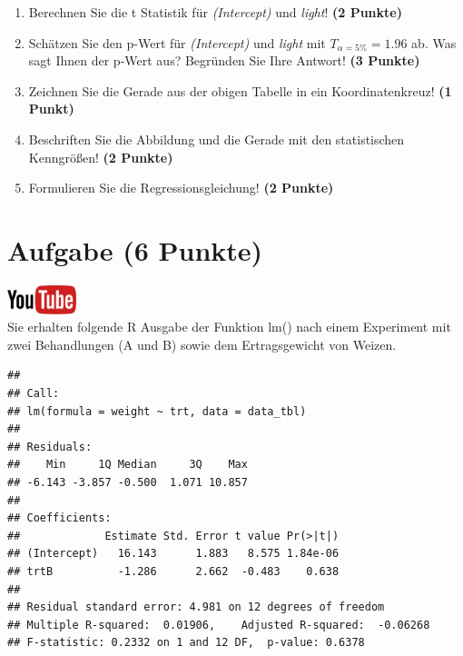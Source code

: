 \documentclass[a4paper, 10pt]{scrartcl}\usepackage[]{graphicx}\usepackage[]{xcolor}
\makeatletter
\newenvironment{kframe}{%
 \def\at@end@of@kframe{}%
 \ifinner\ifhmode%
  \def\at@end@of@kframe{\end{minipage}}%
  \begin{minipage}{\columnwidth}%
 \fi\fi%
 \def\FrameCommand##1{\hskip\@totalleftmargin \hskip-\fboxsep
 \colorbox{shadecolor}{##1}\hskip-\fboxsep
     \hskip-\linewidth \hskip-\@totalleftmargin \hskip\columnwidth}%
 \MakeFramed {\advance\hsize-\width
   \@totalleftmargin\z@ \linewidth\hsize
   \@setminipage}}%
 {\par\unskip\endMakeFramed%
 \at@end@of@kframe}
\newenvironment{knitrout}{}{} %
\makeatother
\begin{document}
\begin{enumerate}
\item Berechnen Sie die t Statistik f{\"u}r \textit{(Intercept)} und
  \textit{light}! \textbf{(2 Punkte)}
\item Sch{\"a}tzen Sie den p-Wert f{\"u}r \textit{(Intercept)} und
  \textit{light} mit $T_{\alpha = 5\%} = 1.96$ ab. Was sagt Ihnen der p-Wert aus?
  Begr{\"u}nden Sie Ihre Antwort! \textbf{(3 Punkte)}
\item Zeichnen Sie die Gerade aus der obigen Tabelle in ein Koordinatenkreuz! \textbf{(1 Punkt)}
\item Beschriften Sie die Abbildung und die Gerade mit den statistischen
  Kenngr{\"o}{\ss}en! \textbf{(2 Punkte)}
\item Formulieren Sie die Regressionsgleichung! \textbf{(2 Punkte)}
\end{enumerate} 
\clearpage

\section{Aufgabe \hfill (6 Punkte)}

\hfill\href{https://youtu.be/tNNzcndrpSk}{\includegraphics[width =
  2cm]{img/youtube}}\\[1Ex]

Sie erhalten folgende R Ausgabe der Funktion lm() nach einem Experiment mit
zwei Behandlungen (A und B) sowie dem Ertragsgewicht von Weizen.

\begin{knitrout}
\color{fgcolor}\begin{kframe}
\begin{verbatim}
## 
## Call:
## lm(formula = weight ~ trt, data = data_tbl)
## 
## Residuals:
##    Min     1Q Median     3Q    Max 
## -6.143 -3.857 -0.500  1.071 10.857 
## 
## Coefficients:
##             Estimate Std. Error t value Pr(>|t|)
## (Intercept)   16.143      1.883   8.575 1.84e-06
## trtB          -1.286      2.662  -0.483    0.638
## 
## Residual standard error: 4.981 on 12 degrees of freedom
## Multiple R-squared:  0.01906,	Adjusted R-squared:  -0.06268 
## F-statistic: 0.2332 on 1 and 12 DF,  p-value: 0.6378
\end{verbatim}
\end{kframe}
\end{knitrout}
\end{document}
